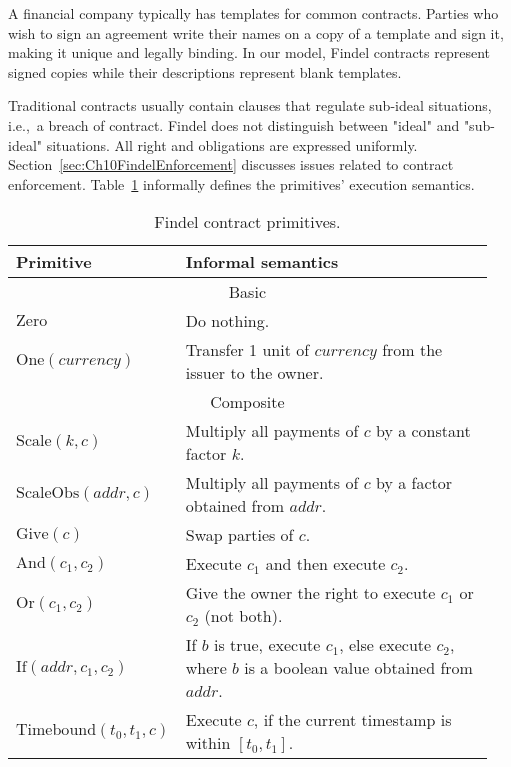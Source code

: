 A financial company typically has templates for common contracts.
Parties who wish to sign an agreement write their names on a copy of a template and sign it, making it unique and legally binding.
In our model, Findel contracts represent signed copies while their descriptions represent blank templates.

Traditional contracts usually contain clauses that regulate sub-ideal situations, i.e.,~a breach of contract.
Findel does not distinguish between "ideal" and "sub-ideal" situations.
All right and obligations are expressed uniformly.
Section~\ref{sec:Ch10FindelEnforcement} discusses issues related to contract enforcement.
Table~\ref{tab:Ch10FindelSemantics} informally defines the primitives' execution semantics.

\begin{table}[ht]
	\centering
	\begin{tabular}{|p{0.25\linewidth}|p{0.70\linewidth}|}
		\hline
		\textbf{Primitive} & \textbf{Informal semantics} \\
		\hline\hline
		\multicolumn{2}{|c|}{Basic}\\
		\hline
		\(\mathrm{Zero}\) & Do nothing. \\
		\hline
		\(\mathrm{One} (currency)\) & Transfer 1 unit of \(currency\) from the issuer to the owner. \\
		\hline\hline
		\multicolumn{2}{|c|}{Composite}\\
		\hline
		\(\mathrm{Scale} (k, c)\) & Multiply all payments of \(c\) by a constant factor \(k\). \\
		\hline
		\(\mathrm{ScaleObs} (addr, c)\) & Multiply all payments of \(c\) by a factor obtained from \(addr\). \\
		\hline
		\(\mathrm{Give} (c)\) & Swap parties of \(c\). \\
		\hline
		\(\mathrm{And} (c_1, c_2)\) & Execute \(c_1\) and then execute \(c_2\). \\
		\hline
		\(\mathrm{Or} (c_1, c_2)\) & Give the owner the right to execute \(c_1\) or \(c_2\) (not both). \\
		\hline
		\(\mathrm{If} (addr, c_1, c_2)\) & If \(b\) is true, execute \(c_1\), else execute \(c_2\), where \(b\) is a boolean value obtained from \(addr\). \\
		\hline
		\(\mathrm{Timebound} (t_0, t_1, c)\) & Execute \(c\), if the current timestamp is within \([t_0, t_1]\). \\
		\hline
	\end{tabular}
	\caption{Findel contract primitives.}
	\label{tab:Ch10FindelSemantics}
\end{table}

